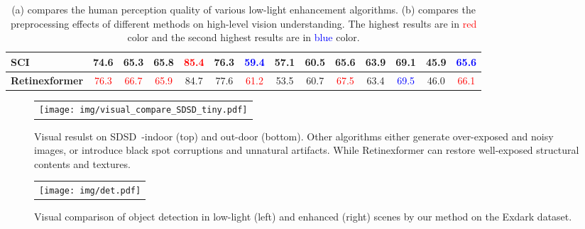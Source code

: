 \documentclass[10pt,twocolumn,letterpaper]{article}
\begin{document}
\begin{table*}[t]
{{\begin{tabular}{lccccccccccccc}
				SCI~\cite{sci}    &74.6 &65.3   &65.8        & \textcolor{red}{85.4}        & 76.3        &\textcolor{blue}{59.4}        &57.1   &60.5  &65.6 &63.9 &69.1 &45.9 &\textcolor{blue}{65.6}   \\
				\midrule[0.15em]
				\textbf{Retinexformer}      &\textcolor{red}{76.3}  &\textcolor{red}{66.7}  &\textcolor{red}{65.9}      &84.7        & 77.6     &\textcolor{red}{61.2}   &53.5 &60.7 &\textcolor{red}{67.5} & 63.4 &\textcolor{blue}{69.5} &46.0  &\textcolor{red}{66.1} \\ 
				\bottomrule[0.15em]
		\end{tabular}}}\vspace{0mm}
	\vspace{-2.5mm}
	\caption{\small (a) compares the human perception quality of various low-light  enhancement algorithms. (b) compares the preprocessing effects of different methods on high-level vision understanding. The highest results are in \textcolor{red}{red} color and the second highest results are in \textcolor{blue}{blue} color.}
	\label{tab:us_lod}\vspace{-2mm}
\end{table*}


\begin{figure*}[t]
	\begin{center}
		\begin{tabular}[t]{c} \hspace{-4mm}
\texttt{[image: img/visual\_compare\_SDSD\_tiny.pdf]}
		\end{tabular}
	\end{center}
	\vspace*{-4mm}
	\caption{\small Visual resulst on SDSD~\cite{sdsd}-indoor (top) and out-door (bottom). Other algorithms either generate over-exposed and  noisy images, or introduce black spot corruptions and unnatural artifacts. While Retinexformer can restore well-exposed structural contents and textures.}
	\label{fig:compare_sdsd}
	\vspace{-4mm}
\end{figure*}

\begin{figure}[h]
	\begin{center}
		\begin{tabular}[t]{c} \hspace{-3.4mm} 
			\texttt{[image: img/det.pdf]}
		\end{tabular}
	\end{center}
	\vspace{-2mm}
	\caption{\small Visual comparison of object detection in low-light (left) and enhanced (right) scenes by our method on the Exdark dataset. }
	\label{fig:det}
	\vspace{-3mm}
\end{figure}
\end{document}
